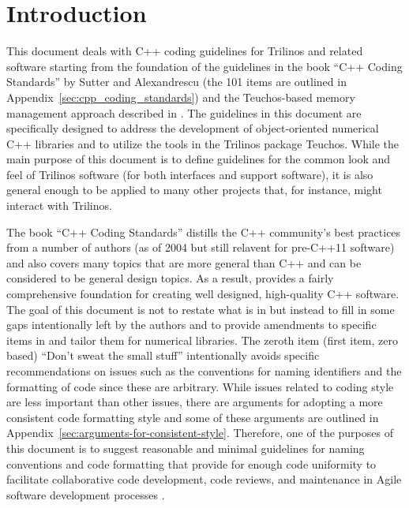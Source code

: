 %
\section{Introduction}
%

This document deals with C++ coding guidelines for Trilinos and
related software starting from the foundation of the guidelines in the
book ``C++ Coding Standards'' by Sutter and Alexandrescu
{}\cite{C++CodingStandards05} (the 101 items are outlined in
Appendix~\ref{sec:cpp_coding_standards}) and the Teuchos-based memory
management approach described in
{}\cite{TeuchosMemoryManagementGuide}.  The guidelines in this
document are specifically designed to address the development of
object-oriented numerical C++ libraries and to utilize the tools in
the Trilinos package Teuchos.  While the main purpose of this document
is to define guidelines for the common look and feel of Trilinos
software (for both interfaces and support software), it is also
general enough to be applied to many other projects that, for
instance, might interact with Trilinos.

The book ``C++ Coding Standards'' {}\cite{C++CodingStandards05}
distills the C++ community's best practices from a number of authors
(as of 2004 but still relavent for pre-C++11 software) and also covers
many topics that are more general than C++ and can be considered to be
general design topics.  As a result, {}\cite{C++CodingStandards05}
provides a fairly comprehensive foundation for creating well designed,
high-quality C++ software.  The goal of this document is not to
restate what is in {}\cite{C++CodingStandards05} but instead to fill
in some gaps intentionally left by the authors and to provide
amendments to specific items in {}\cite{C++CodingStandards05} and
tailor them for numerical libraries.  The zeroth item (first item,
zero based) ``Don't sweat the small stuff'' intentionally avoids
specific recommendations on issues such as the conventions for naming
identifiers and the formatting of code since these are arbitrary.
While issues related to coding style are less important than other
issues, there are arguments for adopting a more consistent code
formatting style and some of these arguments are outlined in
Appendix~\ref{sec:arguments-for-consistent-style}.  Therefore, one of
the purposes of this document is to suggest reasonable and minimal
guidelines for naming conventions and code formatting that provide for
enough code uniformity to facilitate collaborative code development,
code reviews, and maintenance in Agile software development processes
{}\cite{ExtremeProgrammingExplained2nd04}.

